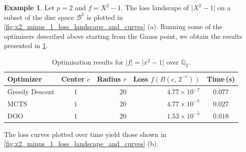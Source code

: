 \documentclass[10pt]{article}
\theoremstyle{definition}
\newtheorem{example}[theorem]{Example}
\begin{document}
\begin{example}
    Let $p=2$ and $f = X^2 - 1$. The loss landscape of $\lvert X^2 - 1 \rvert$ on a subset of the disc space $\mathcal{B}^1$ is plotted in  \cref{fig:x2_minus_1_loss_landscape_and_curves} (a).
    Running some of the optimisers described above starting from the Gauss point, we obtain the results presented in \cref{tab:x2_minus_1_results}.
    \begin{table}
        \centering
        \begin{tabular}{lcrrc}
          \toprule
          Optimizer & Center $c$ & Radius $r$ & Loss $f\!\left(B(c,\,2^{-r})\right)$ & Time\,(s) \\
          \midrule
          Greedy Descent   & $1$ & $20$ & $4.77 \times 10^{-7}$ & $0.077$ \\
          MCTS             & $1$ & $20$ & $4.77 \times 10^{-7}$ & $0.027$ \\
          DOO              & $1$ & $20$ & $1.53 \times 10^{-5}$ & $0.018$ \\
          \bottomrule
        \end{tabular}
        \caption{Optimisation results for $|f|=\lvert x^2 - 1 \rvert$ over $\mathbb{Q}_2$.}
    \label{tab:x2_minus_1_results}
    \end{table}
    The loss curves plotted over time yield those shown in \cref{fig:x2_minus_1_loss_landscape_and_curves} (b).


\end{example}
\end{document}
